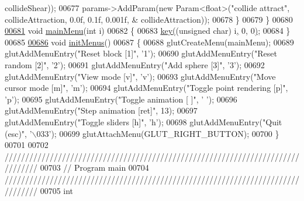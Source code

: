 \begin{DoxyCode}
{{{      collideShear));
00677         params->AddParam(\textcolor{keyword}{new} Param<\textcolor{keywordtype}{float}>(\textcolor{stringliteral}{"collide attract"}, collideAttraction, 0.0f, 0.1f, 0.001f, &
      collideAttraction));
00678     \}
00679 \}
00680 
\hypertarget{particles_8cpp_source_l00681}{}\hyperlink{particles_8cpp_ac623a05dc7ab8844bdf40dc55c124fc6}{00681} \textcolor{keywordtype}{void} \hyperlink{particles_8cpp_ac623a05dc7ab8844bdf40dc55c124fc6}{mainMenu}(\textcolor{keywordtype}{int} i)
00682 \{
00683     \hyperlink{particles_8cpp_a09dcf1dc0fc67f47de1a59851fd7282e}{key}\hyperlink{particles_8cpp_a09dcf1dc0fc67f47de1a59851fd7282e}{(}(\textcolor{keywordtype}{unsigned} \textcolor{keywordtype}{char}) i\hyperlink{particles_8cpp_a09dcf1dc0fc67f47de1a59851fd7282e}{,} 0\hyperlink{particles_8cpp_a09dcf1dc0fc67f47de1a59851fd7282e}{,} 0\hyperlink{particles_8cpp_a09dcf1dc0fc67f47de1a59851fd7282e}{)};
00684 \}
00685 
\hypertarget{particles_8cpp_source_l00686}{}\hyperlink{particles_8cpp_a4f6bd2fa19ee682aad97e42cc236a861}{00686} \textcolor{keywordtype}{void} \hyperlink{particles_8cpp_a4f6bd2fa19ee682aad97e42cc236a861}{initMenus}()
00687 \{
00688     glutCreateMenu(mainMenu);
00689     glutAddMenuEntry(\textcolor{stringliteral}{"Reset block [1]"}, \textcolor{stringliteral}{'1'});
00690     glutAddMenuEntry(\textcolor{stringliteral}{"Reset random [2]"}, \textcolor{stringliteral}{'2'});
00691     glutAddMenuEntry(\textcolor{stringliteral}{"Add sphere [3]"}, \textcolor{stringliteral}{'3'});
00692     glutAddMenuEntry(\textcolor{stringliteral}{"View mode [v]"}, \textcolor{stringliteral}{'v'});
00693     glutAddMenuEntry(\textcolor{stringliteral}{"Move cursor mode [m]"}, \textcolor{stringliteral}{'m'});
00694     glutAddMenuEntry(\textcolor{stringliteral}{"Toggle point rendering [p]"}, \textcolor{stringliteral}{'p'});
00695     glutAddMenuEntry(\textcolor{stringliteral}{"Toggle animation [ ]"}, \textcolor{stringliteral}{' '});
00696     glutAddMenuEntry(\textcolor{stringliteral}{"Step animation [ret]"}, 13);
00697     glutAddMenuEntry(\textcolor{stringliteral}{"Toggle sliders [h]"}, \textcolor{stringliteral}{'h'});
00698     glutAddMenuEntry(\textcolor{stringliteral}{"Quit (esc)"}, \textcolor{stringliteral}{'\(\backslash\)033'});
00699     glutAttachMenu(GLUT\_RIGHT\_BUTTON);
00700 \}
00701 
00702 \textcolor{comment}{////////////////////////////////////////////////////////////////////////////////}
00703 \textcolor{comment}{// Program main}
00704 \textcolor{comment}{////////////////////////////////////////////////////////////////////////////////}
00705 \textcolor{keywordtype}{int}
}}}
\end{DoxyCode}
